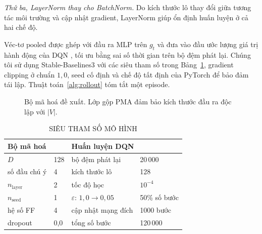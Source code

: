 \documentclass[10pt, conference, a4paper, compsocconf]{IEEEtran}
\begin{document}
\emph{Thứ ba, LayerNorm thay cho BatchNorm.} Do kích thước lô thay đổi giữa
tương tác môi trường và cập nhật gradient, LayerNorm giúp ổn định huấn luyện
ở cả hai chế độ.

Véc-tơ $\text{pooled}$ được ghép với đầu ra MLP trên $g_t$ và đưa vào đầu
ước lượng giá trị hành động của DQN \cite{mnih2015human}, tối ưu bằng sai số
thời gian trên bộ đệm phát lại. Chúng tôi sử dụng Stable-Baselines3
\cite{stable_baselines3} với các siêu tham số trong Bảng~\ref{tab:hparams},
gradient clipping ở chuẩn $1{,}0$, seed cố định và chế độ tất định của
PyTorch để bảo đảm tái lập. Thuật toán~\ref{alg:rollout} tóm tắt một episode.

\begin{figure}[!t]
\centering
{}
\caption{Bộ mã hoá đề xuất. Lớp gộp PMA đảm bảo kích thước đầu ra độc lập với $|V|$.}
\label{fig:arch}
\end{figure}

\begin{table}[!t]
\renewcommand{\arraystretch}{1.05}
\setlength{\tabcolsep}{4pt}
\caption{SIÊU THAM SỐ MÔ HÌNH}
\label{tab:hparams}
\centering\footnotesize
\begin{tabular}{llll}
\toprule
\multicolumn{2}{l}{\textbf{Bộ mã hoá}} & \multicolumn{2}{l}{\textbf{Huấn luyện DQN}} \\
\midrule
$D$ & 128 & bộ đệm phát lại & 20\,000 \\
số đầu chú ý & 4 & kích thước lô & 128 \\
$n_{\text{layer}}$ & 2 & tốc độ học & $10^{-4}$ \\
$n_{\text{seed}}$ & 1 & $\varepsilon$: $1{,}0\!\rightarrow\!0{,}05$ & 50\% số bước \\
hệ số FF & 4 & cập nhật mạng đích & 1000 bước \\
dropout & 0,0 & tổng số bước & 120\,000 \\
\bottomrule
\end{tabular}
\end{table}
\end{document}

